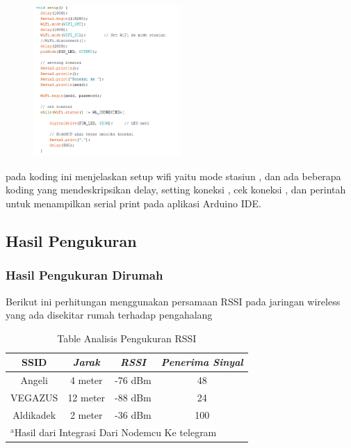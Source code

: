\documentclass[conference]{IEEEtran}
\begin{document}
\begin{figure}[h]
    \centering
    \includegraphics[width=0.5\textwidth]{codingesp2.png}
\end{figure}



\vspace{7cm}

pada koding ini menjelaskan setup wifi yaitu mode stasiun , dan ada beberapa
koding yang mendeskripsikan delay, setting koneksi , cek koneksi , dan perintah untuk menampilkan serial print pada aplikasi Arduino IDE.




\subsection{Hasil Pengukuran}
\subsubsection{Hasil Pengukuran Dirumah}
Berikut ini perhitungan menggunakan persamaan RSSI 
pada jaringan wireless yang ada disekitar rumah terhadap pengahalang

    \begin{table}[htbp]
    \caption{Table Analisis Pengukuran RSSI}
    \begin{center}
    \begin{tabular}{|c|c|c|c|}
        \hline
    \textbf{SSID} & \textbf{\textit{Jarak}}& \textbf{\textit{RSSI}}& \textbf{\textit{Penerima Sinyal}} \\
    \hline
    Angeli & 4 meter& -76 dBm & 48  \\
    \hline
    VEGAZUS & 12 meter& -88 dBm & 24  \\
    \hline
    Aldikadek & 2 meter& -36 dBm & 100   \\
    \hline
    \multicolumn{4}{l}{$^{\mathrm{a}}$Hasil dari Integrasi Dari Nodemcu Ke telegram}
    \end{tabular}
    \label{tab1}
    \end{center}
    \end{table}
\end{document}
